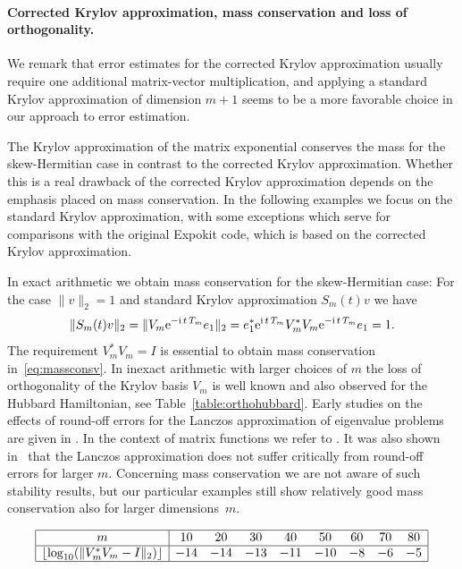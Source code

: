 \documentclass[smallextended]{svjour3pre}%
\numberwithin{equation}{section}
\numberwithin{figure}{section}
\numberwithin{table}{section}
\newcommand\tjnew[1]{{#1}}
\newcommand{\ee}{{\rm e}}
\newcommand{\ii}{{\rm i}}
\begin{document}
\paragraph{Corrected Krylov approximation, mass conservation and loss of orthogonality.}
We remark that error estimates for the corrected Krylov approximation
usually require one additional matrix-vector multiplication, and applying a standard
Krylov approximation of dimension $m+1$ seems to
be a more favorable choice in our approach to error estimation.

The Krylov approximation of the matrix exponential
conserves the mass for the skew-Hermitian case
in contrast to the
corrected Krylov approximation.
Whether this is a real drawback of the corrected Krylov approximation
depends on the emphasis placed on mass conservation.
In the following examples we focus on the standard Krylov approximation,
with some exceptions which serve for comparisons with the original Expokit code, which is based on the corrected Krylov approximation.

In exact arithmetic we obtain mass conservation for the skew-Hermitian case:
For the case $\|v\|_2=1$ and standard Krylov approximation $S_m(t)v$ we have
\begin{equation}\label{eq:massconsv}
\|S_m(t)v\|_2 = \|V_m \ee^{-\ii\,t\,T_m}e_1\|_2 = e_1^\ast \ee^{\ii\,t\,T_m} V_m^\ast V_m\ee^{-\ii\,t\,T_m}e_1=1.
\end{equation}
The requirement $V_m^\ast V_m=I$ is essential to obtain mass conservation in~\eqref{eq:massconsv}.
In inexact arithmetic with larger choices of $m$ the loss of orthogonality of the Krylov basis $V_m$ is well known
and also observed for the Hubbard Hamiltonian, see Table~\ref{table:orthohubbard}.
\tjnew{Early studies on the effects of round-off errors for the Lanczos approximation of eigenvalue problems are given in \cite{Pa76}.
In the context of matrix functions we refer to \cite{druskinetal98,DK91,Gre89}.}
It was \tjnew{also} shown in~\cite{MMS18X} that the Lanczos approximation does not suffer critically from round-off errors for larger $m$.
Concerning mass conservation we are not aware of such stability results,
but \tjnew{our particular} examples still show relatively good mass conservation also for larger dimensions~$m$.

\begin{table}
\centering
\caption{Loss of orthogonality of the Krylov basis for the Hubbard model.}\label{table:orthohubbard}
\begin{equation*}
\begin{array}{|c|cccccccc|}\hline
m & 10 & 20 & 30 & 40 & 50 & 60 & 70 & 80\\\hline
\lfloor\log_{10}(\|V_m^\ast V_m-I\|_2)\rfloor & -14 & -14 & -13 & -11 & -10 & -8 & -6 & -5\\\hline
\end{array}
\end{equation*}
\end{table}
\end{document}
